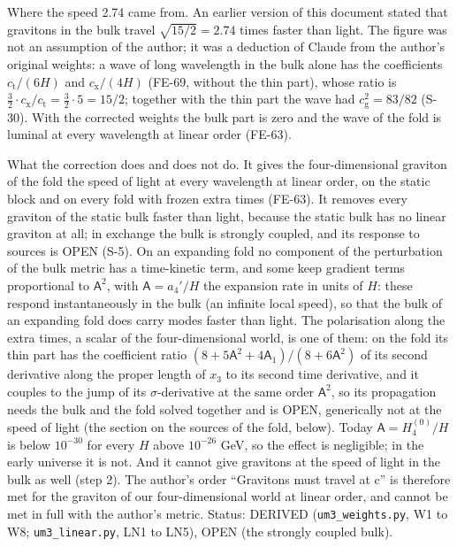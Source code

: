 \documentclass[
  10pt,
]{article}
\begin{document}
Where the speed 2.74 came from. An earlier version of this document
stated that gravitons in the bulk travel \(\sqrt{15/2} = 2.74\) times
faster than light. The figure was not an assumption of the author; it
was a deduction of Claude from the author's original weights: a wave of
long wavelength in the bulk alone has the coefficients
\(c_{\mathrm{t}}/(6H)\) and \(c_{\mathrm{x}}/(4H)\) (FE-69, without the
thin part), whose ratio is
\(\frac32 \cdot c_{\mathrm{x}}/c_{\mathrm{t}} = \frac32 \cdot 5 = 15/2\);
together with the thin part the wave had \(c_{\mathrm{g}}^2 = 83/82\)
(S-30). With the corrected weights the bulk part is zero and the wave of
the fold is luminal at every wavelength at linear order (FE-63).

What the correction does and does not do. It gives the four-dimensional
graviton of the fold the speed of light at every wavelength at linear
order, on the static block and on every fold with frozen extra times
(FE-63). It removes every graviton of the static bulk faster than light,
because the static bulk has no linear graviton at all; in exchange the
bulk is strongly coupled, and its response to sources is OPEN (S-5). On
an expanding fold no component of the perturbation of the bulk metric
has a time-kinetic term, and some keep gradient terms proportional to
\(\mathsf{A}^2\), with \(\mathsf{A} = a_4'/H\) the expansion rate in
units of \(H\): these respond instantaneously in the bulk (an infinite
local speed), so that the bulk of an expanding fold does carry modes
faster than light. The polarisation along the extra times, a scalar of
the four-dimensional world, is one of them: on the fold its thin part
has the coefficient ratio
\((8 + 5\mathsf{A}^2 + 4\mathsf{A}_1)/(8 + 6\mathsf{A}^2)\) of its
second derivative along the proper length of \(x_3\) to its second time
derivative, and it couples to the jump of its \(\sigma\)-derivative at
the same order \(\mathsf{A}^2\), so its propagation needs the bulk and
the fold solved together and is OPEN, generically not at the speed of
light (the section on the sources of the fold, below). Today
\(\mathsf{A} = H_4^{(0)}/H\) is below \(10^{-30}\) for every \(H\) above
\(10^{-26}\) GeV, so the effect is negligible; in the early universe it
is not. And it cannot give gravitons at the speed of light in the bulk
as well (step 2). The author's order ``Gravitons must travel at c'' is
therefore met for the graviton of our four-dimensional world at linear
order, and cannot be met in full with the author's metric. Status:
DERIVED (\texttt{um3\_weights.py}, W1 to W8; \texttt{um3\_linear.py},
LN1 to LN5), OPEN (the strongly coupled bulk).
\end{document}
